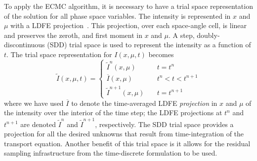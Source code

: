 \documentclass{anstrans}
\begin{document}
To apply the ECMC algorithm, it is necessary to have a trial space representation
of the solution for all phase space variables.  The intensity is represented in $x$ and $\mu$ with a
LDFE projection~\cite{bolding_nse}.  This projection, over each space-angle cell, is linear and preserves the zeroth, and
first moment in $x$ and $\mu$.  A step, doubly-discontinuous (SDD) trial
space is used to represent the intensity as a function of $t$.  The trial space
representation for $I(x,\mu,t)$ becomes 
\begin{equation}\label{eq:time_space}
    \tilde I(x,\mu,t) = \left \{ \begin{array}{cl}
        \tilde I^{n}(x,\mu)  & \quad t = t^n \\ 
        \overline I(x,\mu)  & \quad t^{n} < t <t^{n+1} \\               
      \tilde I^{n+1}(x,\mu)   &  \quad        t = t^{n+1}
    \end{array}           \right.
\end{equation}
where we have used $\overline I$ to denote the time-averaged LDFE \emph{projection} in $x$
and $\mu$ of the intensity over the interior of the time step;  the LDFE projections at
$t^{n}$ and $t^{n+1}$ are denoted $\tilde I^{n}$ and $\tilde I^{n+1}$, respectively.    
 The SDD trial space provides a
projection for all the desired unknowns that result from time-integration of the transport
equation. Another benefit of this
trial space is it allows for the residual sampling infrastructure from the
time-discrete formulation to be used. 
\end{document}
